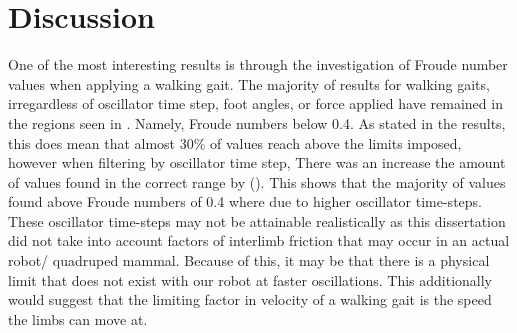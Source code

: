



\section{Discussion}
One of the most interesting results is through the investigation of Froude number values when applying a walking gait. The majority of results for walking gaits, irregardless of oscillator time step, foot angles, or force applied have remained in the regions seen in \cite{Alexander1983}. Namely, Froude numbers below 0.4. As stated in the results, this does mean that almost 30\% of values reach above the limits imposed, however when filtering by oscillator time step, There was an increase the amount of values found in the correct range by (). This shows that the majority of values found above Froude numbers of 0.4 where due to higher oscillator time-steps. These oscillator time-steps may not be attainable realistically as this dissertation did not take into account factors of interlimb friction that may occur in an actual robot/ quadruped mammal. Because of this, it may be that there is a physical limit that does not exist with our robot at faster oscillations. This additionally would suggest that the limiting factor in velocity of a walking gait is the speed the limbs can move at. 

